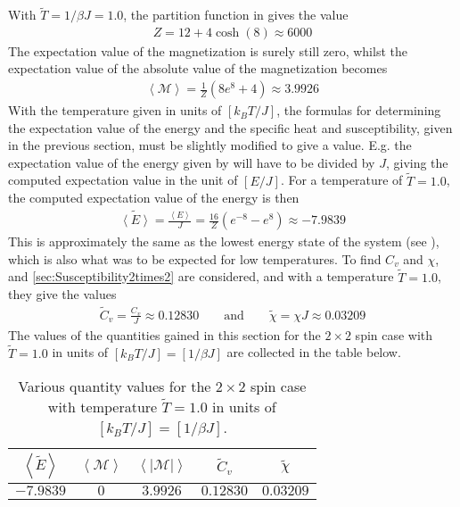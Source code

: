 With $\tilde{T} = 1/\beta J = 1.0$, the partition function in  gives the value
\begin{align}
	Z = 12+4\cosh(8) \approx 6000
\end{align}
The expectation value of the magnetization is surely still zero, whilst the expectation value of the absolute value of the magnetization becomes
\begin{align}
	\left< \mathcal{M} \right> = \frac{1}{Z} ( 8 e^8 +4) \approx 3.9926
\end{align}
With the temperature given in units of $[k_B T/J]$, the formulas for determining the expectation value of the energy and the specific heat and susceptibility, given in the previous section, must be slightly modified to give a value.
E.g. the expectation value of the energy given by  will have to be divided by $J$, giving the computed expectation value in the unit of $[E/J]$. 
For a temperature of $\tilde{T} = 1.0$, the computed expectation value of the energy is then
\begin{align}
	\tilde{\left< E \right>} 
	= \frac{\left< E \right>}{J}	
	= \frac{16}{Z} (e^{-8}-e^{8}) \approx -7.9839 
\end{align} 
This is approximately the same as the lowest energy state of the system (see ), which is also what was to be expected for low temperatures. 
To find $C_v$ and $\chi$,  and \eqref{sec:Susceptibility2times2} are considered, and with a temperature $\tilde{T}  = 1.0$, they give the values
\begin{align*}
	\tilde{C}_v = \frac{C_v}{J}
	\approx 0.12830
	\qquad \text{and} \qquad
	\tilde{\chi} = \chi J \approx 0.03209
\end{align*}
The values of the quantities gained in this section for the $2\times 2$ spin case with $\tilde{T} = 1.0$ in units of $[k_B T/J] = [1/\beta J]$ are collected in the table below.
\begin{table}[H]
\centering
\caption{Various quantity values for the $2\times 2$ spin case with temperature $\tilde{T} = 1.0$ in units of $[k_B T/J] = [1/\beta J]$.}
\begin{center}
\begin{tabular}{ | c | c | c | c | c | }
  \hline			
  $\left< \tilde{E} \right>$ & $\left< \mathcal{M} \right> $ &  $\left< |\mathcal{M} | \right> $ & $\tilde{C}_v $ & $\tilde{\chi}$  \\
  \hline
  $-7.9839$ & $0$ & $3.9926$ & $0.12830$ & $0.03209$ \\
  \hline
\end{tabular}
\end{center}
\label{tab:ClosedFormSolution2times2T1}
\end{table}
